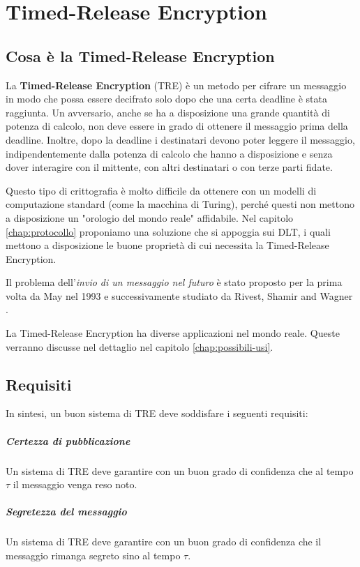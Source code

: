 \chapter{Timed-Release Encryption}

\section{Cosa è la Timed-Release Encryption}
La \textbf{Timed-Release Encryption} (TRE)
è un metodo per cifrare un messaggio in modo che possa
essere decifrato solo dopo che una certa deadline è stata raggiunta.
Un avversario, anche se ha a disposizione una grande quantità di potenza di calcolo,
non deve essere in grado di ottenere il messaggio prima della deadline.
Inoltre, dopo la deadline i destinatari devono poter leggere il messaggio,
indipendentemente dalla potenza di calcolo che hanno a disposizione e
senza dover interagire con il mittente,
con altri destinatari o con terze parti fidate.

Questo tipo di crittografia è molto difficile da ottenere con un modelli
di computazione standard (come la macchina di Turing), perché questi non mettono
a disposizione un "orologio del mondo reale" affidabile.
Nel capitolo \ref{chap:protocollo} proponiamo una soluzione che si appoggia sui DLT,
i quali mettono a disposizione
le buone proprietà di cui necessita la Timed-Release Encryption.

Il problema dell'\textit{invio di un messaggio nel futuro} è stato proposto per la prima volta
da May \cite{May:time-released-crypto} nel 1993 e
successivamente studiato da Rivest, Shamir and Wagner \cite{Rivest96time-lockpuzzles}.

La Timed-Release Encryption ha diverse applicazioni nel mondo reale. Queste verranno
discusse nel dettaglio nel capitolo \ref{chap:possibili-usi}.

\section{Requisiti}
In sintesi, un buon sistema di TRE deve soddisfare i seguenti requisiti:

\paragraph{Certezza di pubblicazione}
Un sistema di TRE deve garantire con un buon
grado di confidenza che al tempo $ \tau $ il messaggio venga reso noto.

\paragraph{Segretezza del messaggio}
\label{subsec:segretezza-tre}
Un sistema di TRE deve garantire con un buon
grado di confidenza che il messaggio rimanga segreto sino al tempo $ \tau $.


